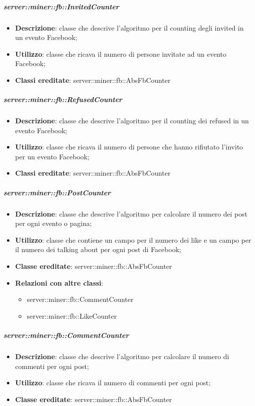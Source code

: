 	\subparagraph{server::miner::fb::InvitedCounter} %
		\label{subp:server_miner_fb_InvitedCunter}
			\begin{itemize}
				\item \textbf{Descrizione}: classe che descrive l'algoritmo per il counting degli invited in un evento Facebook;
				\item \textbf{Utilizzo}: classe che ricava il numero di persone invitate ad un evento Facebook;
				\item \textbf{Classi ereditate}: server::miner::fb::AbsFbCounter
			\end{itemize}

	\subparagraph{server::miner::fb::RefusedCounter} %
		\label{subp:server_miner_fb_RefusedCounter}
			\begin{itemize}
				\item \textbf{Descrizione}: classe che descrive l'algoritmo per il counting dei refused in un evento Facebook;
				\item \textbf{Utilizzo}: classe che ricava il numero di persone che hanno rifiutato l'invito per un evento Facebook;
				\item \textbf{Classi ereditate}: server::miner::fb::AbsFbCounter
			\end{itemize}

	\subparagraph{server::miner::fb::PostCounter} %
		\label{subp:server_miner_fb_PostCounter}
			\begin{itemize}
				\item \textbf{Descrizione}: classe che descrive l'algoritmo per calcolare il numero dei post per ogni evento o pagina;
				\item \textbf{Utilizzo}: classe che contiene un campo per il numero dei like e un campo per il numero dei talking about per ogni post di Facebook;
				\item \textbf{Classe ereditate}: server::miner::fb::AbsFbCounter
				\item \textbf{Relazioni con altre classi}:
					\begin{itemize}
						\item server::miner::fb::CommentCounter
						\item server::miner::fb::LikeCounter
					\end{itemize}
			\end{itemize}

	\subparagraph{server::miner::fb::CommentCounter} %
		\label{subp:server_miner_fb_CommentCounter}
			\begin{itemize}
				\item \textbf{Descrizione}: classe che descrive l'algoritmo per calcolare il numero di commenti per ogni post;
				\item \textbf{Utilizzo}: classe che ricava il numero di commenti per ogni post;
				\item \textbf{Classe ereditate}: server::miner::fb::AbsFbCounter
			\end{itemize}

